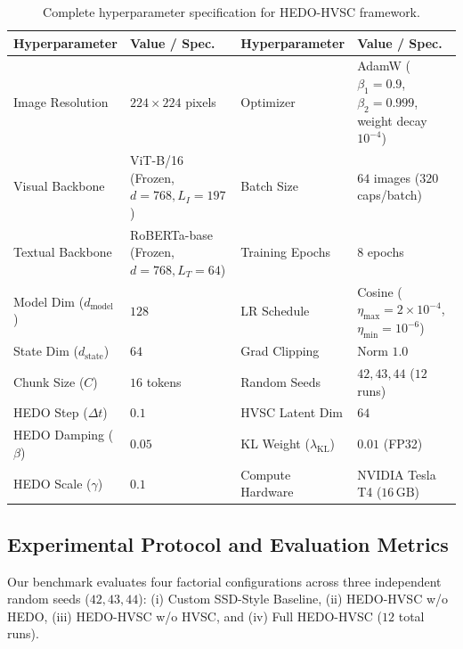 \documentclass[journal]{IEEEtran}
\begin{document}
\begin{table}[!t]
\centering
\footnotesize
\caption{Complete hyperparameter specification for HEDO-HVSC framework.}
\label{tab:hyperparameters}
\setlength{\tabcolsep}{2.5pt}
\renewcommand{\arraystretch}{1.15}
\begin{tabularx}{\columnwidth}{@{}>{\raggedright\arraybackslash}p{}>{\raggedright\arraybackslash}p{}|>{\raggedright\arraybackslash}p{}>{\raggedright\arraybackslash}X@{}}
\toprule
\textbf{Hyperparameter} & \textbf{Value / Spec.} & \textbf{Hyperparameter} & \textbf{Value / Spec.} \\
\midrule
Image Resolution & $224 \times 224$ pixels & Optimizer & AdamW ($\beta_1=0.9$, $\beta_2=0.999$, weight decay $10^{-4}$) \\
Visual Backbone & ViT-B/16 (Frozen, $d=768, L_I=197$) & Batch Size & $64$ images ($320$ caps/batch) \\
Textual Backbone & RoBERTa-base (Frozen, $d=768, L_T=64$) & Training Epochs & $8$ epochs \\
Model Dim ($d_{\text{model}}$) & $128$ & LR Schedule & Cosine ($\eta_{\text{max}}=2\times 10^{-4}$, $\eta_{\text{min}}=10^{-6}$) \\
State Dim ($d_{\text{state}}$) & $64$ & Grad Clipping & Norm $1.0$ \\
Chunk Size ($C$) & $16$ tokens & Random Seeds & $42, 43, 44$ ($12$ runs) \\
HEDO Step ($\Delta t$) & $0.1$ & HVSC Latent Dim & $64$ \\
HEDO Damping ($\beta$) & $0.05$ & KL Weight ($\lambda_{\text{KL}}$) & $0.01$ (FP32) \\
HEDO Scale ($\gamma$) & $0.1$ & Compute Hardware & NVIDIA Tesla T4 ($16\,\text{GB}$) \\
\bottomrule
\end{tabularx}
\end{table}

\subsection{Experimental Protocol and Evaluation Metrics}
Our benchmark evaluates four factorial configurations across three independent random seeds ($42, 43, 44$): (i) Custom SSD-Style Baseline, (ii) HEDO-HVSC w/o HEDO, (iii) HEDO-HVSC w/o HVSC, and (iv) Full HEDO-HVSC ($12$ total runs).
\end{document}
